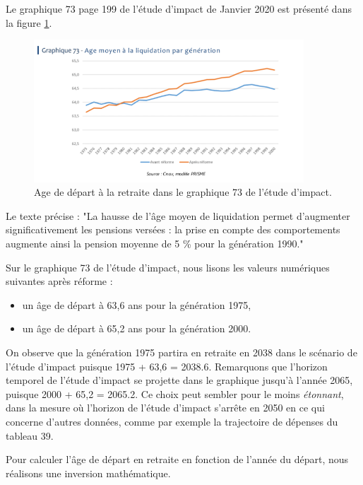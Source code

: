 \documentclass[10pt]{article}
\begin{document}
Le graphique 73 page 199 de l'étude d'impact de Janvier 2020 est présenté 
dans la figure \ref{fig-age-etude-impact-graphique-73}.

\begin{figure}
\begin{center}
\includegraphics[width=0.9\textwidth]{../Figures-Etude-Impact/EtudeImpact-Graphique-73-AgeDepartRetraite.png}
\end{center}
\caption{Age de départ à la retraite dans le graphique 73 de l'étude d'impact.}
\label{fig-age-etude-impact-graphique-73}
\end{figure}

Le texte précise : "La hausse de l’âge moyen de liquidation permet d’augmenter 
significativement les pensions versées : la prise en compte des comportements 
augmente ainsi la pension moyenne de 5 \% pour la génération 1990."

Sur le graphique 73 de l'étude d'impact, nous lisons les valeurs numériques 
suivantes après réforme :
\begin{itemize}
\item un âge de départ à 63,6 ans pour la génération 1975,
\item un âge de départ à 65,2 ans pour la génération 2000.
\end{itemize}

On observe que la génération 1975 partira en retraite en 2038 dans le scénario de l'étude d'impact puisque 1975 + 63,6 = 2038.6.
Remarquons que l'horizon temporel de l'étude d'impact se projette dans le graphique jusqu'à l'année 2065, puisque 2000 + 65,2 = 2065.2. 
Ce choix peut sembler pour le moins \emph{étonnant}, dans la mesure où l'horizon 
de l'étude d'impact s'arrête en 2050 en ce qui concerne d'autres données, 
comme par exemple la trajectoire de dépenses du tableau 39. 

Pour calculer l'âge de départ en retraite en fonction de l'année du départ, 
nous réalisons une inversion mathématique.  
\end{document}
